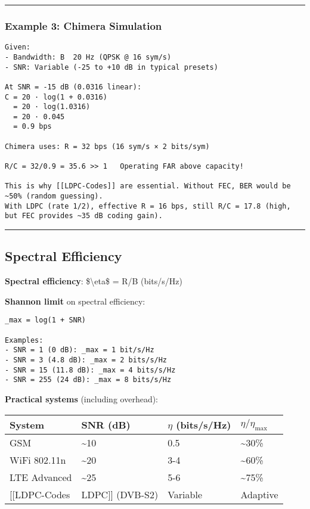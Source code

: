 \begin{center}\rule{0.5\linewidth}{0.5pt}\end{center}

\subsubsection{Example 3: Chimera
Simulation}\label{example-3-chimera-simulation}

\begin{verbatim}
Given:
- Bandwidth: B  20 Hz (QPSK @ 16 sym/s)
- SNR: Variable (-25 to +10 dB in typical presets)

At SNR = -15 dB (0.0316 linear):
C = 20 · log(1 + 0.0316)
  = 20 · log(1.0316)
  = 20 · 0.045
  = 0.9 bps

Chimera uses: R = 32 bps (16 sym/s × 2 bits/sym)

R/C = 32/0.9 = 35.6 >> 1   Operating FAR above capacity!

This is why [[LDPC-Codes]] are essential. Without FEC, BER would be ~50% (random guessing).
With LDPC (rate 1/2), effective R = 16 bps, still R/C = 17.8 (high, but FEC provides ~35 dB coding gain).
\end{verbatim}

\begin{center}\rule{0.5\linewidth}{0.5pt}\end{center}

\subsection{\texorpdfstring{ Spectral
Efficiency}{ Spectral Efficiency}}\label{spectral-efficiency}

\textbf{Spectral efficiency}: \$\textbackslash eta\$ = R/B (bits/s/Hz)

\textbf{Shannon limit} on spectral efficiency:

\begin{verbatim}
_max = log(1 + SNR)

Examples:
- SNR = 1 (0 dB): _max = 1 bit/s/Hz
- SNR = 3 (4.8 dB): _max = 2 bits/s/Hz
- SNR = 15 (11.8 dB): _max = 4 bits/s/Hz
- SNR = 255 (24 dB): _max = 8 bits/s/Hz
\end{verbatim}

\textbf{Practical systems} (including overhead):

{\def\LTcaptype{} %
\begin{longtable}[]{@{}llll@{}}
\toprule\noalign{}
System & SNR (dB) & \(\eta\) (bits/s/Hz) & \(\eta/\eta_{\text{max}}\) \\
\midrule\noalign{}
\endhead
\bottomrule\noalign{}
\endlastfoot
GSM & \textasciitilde10 & 0.5 & \textasciitilde30\% \\
WiFi 802.11n & \textasciitilde20 & 3-4 & \textasciitilde60\% \\
LTE Advanced & \textasciitilde25 & 5-6 & \textasciitilde75\% \\
{[}{[}LDPC-Codes & LDPC{]}{]} (DVB-S2) & Variable & Adaptive \\
\end{longtable}
}

